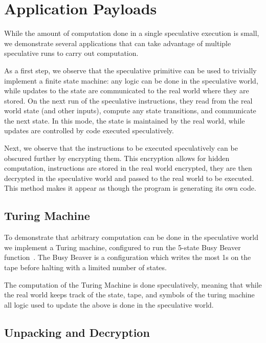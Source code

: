 
\section{Application Payloads}

While the amount of computation done in a single speculative execution is small,
we demonstrate several applications that can take advantage of multiple
speculative runs to carry out computation.

As a first step, we observe that the speculative primitive can be used to trivially
implement a finite state machine: any logic can be done in the speculative
world, while updates to the state are communicated to the real world where they
are stored. On the next run of the speculative instructions, they read from the
real world state (and other inputs), compute any state transitions, and
communicate the next state. In this mode, the state is maintained by the real world,
while updates are controlled by code executed speculatively.

Next, we observe that the instructions to be executed speculatively can be
obscured further by encrypting them. This encryption allows for hidden
computation, instructions are stored in the real world encrypted, they are then
decrypted in the speculative world and passed to the real world to be executed.
This method makes it appear as though the program is generating its own code.

\FigGeneralModel

\subsection{Turing Machine}
\label{subsec:turing}
To demonstrate that arbitrary computation can be done in the speculative world
we implement a Turing machine, configured to run the 5-state Busy Beaver 
function~\cite{chaitin1987computing,herken1992universal}.
The Busy Beaver is a configuration which writes the most
1s on the tape before halting with a limited number of states.

The computation of the Turing Machine is done speculatively, meaning that while
the real world keeps track of the state, tape, and symbols of the turing machine
all logic used to update the above is done in the speculative world.

\subsection{Unpacking and Decryption}
\label{subsec:decryption}

